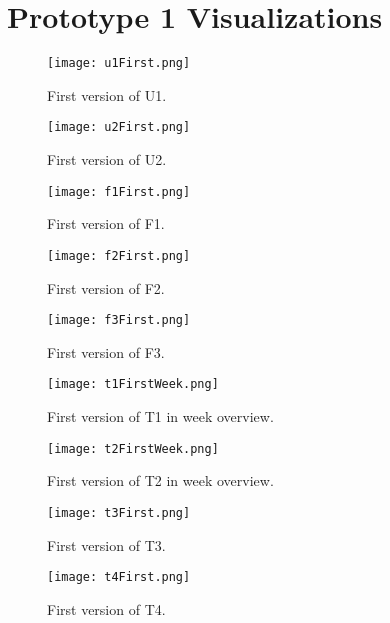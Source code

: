 \chapter{Prototype 1 Visualizations}
\label{prototype1Viz}

\begin{figure}[h!]
\centering
\texttt{[image: u1First.png]}
\caption{First version of U1.}
\end{figure}

\begin{figure}[h!]
\centering
\texttt{[image: u2First.png]}
\caption{First version of U2.}
\end{figure}

\begin{figure}[h!]
\centering
\texttt{[image: f1First.png]}
\caption{First version of F1.}
\end{figure}

\begin{figure}[h!]
\centering
\texttt{[image: f2First.png]}
\caption{First version of F2.}
\end{figure}

\begin{figure}[h!]
\centering
\texttt{[image: f3First.png]}
\caption{First version of F3.}
\end{figure}

\begin{figure}[h!]
\centering
\texttt{[image: t1FirstWeek.png]}
\caption[First version of T1.]{First version of T1 in week overview.}
\end{figure}

\begin{figure}[h!]
\centering
\texttt{[image: t2FirstWeek.png]}
\caption[First version of T2.]{First version of T2 in week overview.}
\end{figure}

\begin{figure}[h!]
\centering
\texttt{[image: t3First.png]}
\caption{First version of T3.}
\end{figure}

\begin{figure}[h!]
\centering
\texttt{[image: t4First.png]}
\caption{First version of T4.}
\end{figure}


